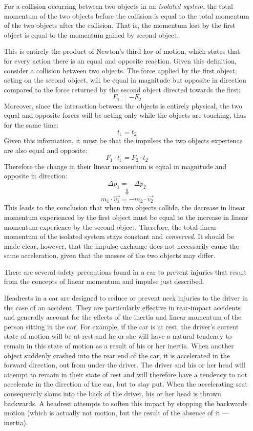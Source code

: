 \begin{displayquote}
	For a collision occurring between two objects in an \emph{isolated system}, the total momentum of the two objects before the collision is equal to the total momentum of the two objects after the collision. That is, the momentum lost by the first object is equal to the momentum gained by second object.
\end{displayquote}

This is entirely the product of Newton's third law of motion, which states that for every action there is an equal and opposite reaction. Given this definition, consider a collision between two objects. The force applied by the first object, acting on the second object, will be equal in magnitude but opposite in direction compared to the force returned by the second object directed towards the first: $$F_1 = -F_2$$ Moreover, since the interaction between the objects is entirely physical, the two equal and opposite forces will be acting only while the objects are touching, thus for the same time: $$t_1 = t_2$$ Given this information, it must be that the impulses the two objects experience are also equal and opposite: $$F_1 \cdot t_1 = F_2 \cdot t_2$$ Therefore the change in their linear momentum is equal in magnitude and opposite in direction: $$\Delta p_1 = -\Delta p_2$$ $$\Downarrow$$ $$m_1 \cdot \vec{v_1} = -m_2 \cdot \vec{v_2}$$ This leads to the conclusion that when two objects collide, the decrease in linear momentum experienced by the first object must be equal to the increase in linear momentum experience by the second object. Therefore, the total linear momentum of the isolated system stays constant and \emph{conserved}. It should be made clear, however, that the impulse exchange does not necessarily cause the same acceleration, given that the masses of the two objects may differ.


There are several safety precautions found in a car to prevent injuries that result from the concepts of linear momentum and impulse just described. 


Headrests in a car are designed to reduce or prevent neck injuries to the driver in the case of an accident. They are particularly effective in rear-impact accidents and generally account for the effects of the inertia and linear momentum of the person sitting in the car. For example, if the car is at rest, the driver's current state of motion will be at rest and he or she will have a natural tendency to remain in this state of motion as a result of his or her inertia. When another object suddenly crashed into the rear end of the car, it is accelerated in the forward direction, out from under the driver. The driver and his or her head will attempt to remain in their state of rest and will therefore have a tendency to not accelerate in the direction of the car, but to stay put. When the accelerating seat consequently slams into the back of the driver, his or her head is thrown backwards. A headrest attempts to soften this impact by stopping the backwards motion (which is actually not motion, but the result of the absence of it --- inertia).

